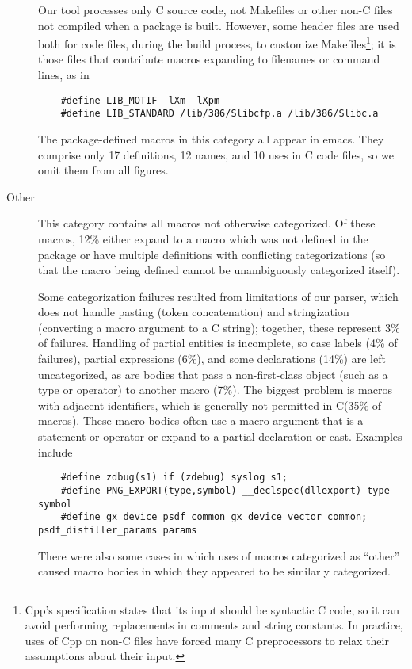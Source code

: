 \documentclass[10pt]{article}
\def\nummacrodefs{26182}        %
\newcommand{\pkg}[1]{\textsf{#1}}
\begin{document}
\begin{description}
  Our tool processes only C source code, not Makefiles or other non-C files
  not compiled when a package is built.  However, some header files are
  used both for code files, during the build process, to customize
  Makefiles\footnote{Cpp's specification states that its input should be
    syntactic C code, so it can avoid performing replacements in comments
    and string constants.  In practice, uses of Cpp on non-C files have
    forced many C preprocessors to relax their assumptions about their
    input.}; it is those files that contribute macros expanding to
  filenames or command lines, as in
\begin{verbatim}
    #define LIB_MOTIF -lXm -lXpm
    #define LIB_STANDARD /lib/386/Slibcfp.a /lib/386/Slibc.a
\end{verbatim}
  The package-defined macros in this category all appear in \pkg{emacs}.
  They comprise only 17 definitions, 12 names, and 10 uses in C
  code files, so we omit them from all figures.
  
\item[Other]
  This category contains all macros not otherwise categorized.  
  Of these macros, 12\% either expand to a macro
  which was not defined in the package or have multiple definitions with
  conflicting categorizations (so that the macro being defined cannot be
  unambiguously categorized itself).
  
  Some categorization failures resulted from limitations of our parser, which does not
  handle pasting (token concatenation) and stringization (converting a macro
  argument to a C string); together, these represent 3\% of failures.  Handling of partial
  entities is incomplete, so case labels (4\% of failures), partial expressions (6\%),
  and some declarations (14\%) are left uncategorized, as are bodies that
  pass a non-first-class object (such as a type or operator) to another
  macro (7\%).  The biggest problem is macros with adjacent identifiers, which
  is generally not permitted in C\@ (35\% of macros).  These macro bodies
  often use a macro argument that is a statement or operator or expand to
  a partial declaration or cast.  Examples include
\begin{verbatim}
    #define zdbug(s1) if (zdebug) syslog s1;
    #define PNG_EXPORT(type,symbol) __declspec(dllexport) type symbol
    #define gx_device_psdf_common gx_device_vector_common; psdf_distiller_params params
\end{verbatim}
  There were also some cases in which uses of macros categorized as
  ``other'' caused macro bodies in which they appeared to be similarly
  categorized.
  

\end{description}
\end{document}
